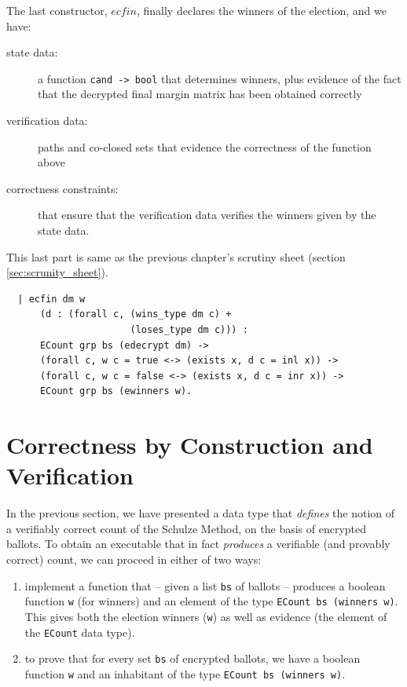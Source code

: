  \noindent
The last constructor, $ecfin$, finally declares the winners of the election,
and we have:
\begin{description}
  \item[state data:] a function \texttt{cand -> bool} that determines
  winners, plus evidence of the fact that the decrypted final margin
  matrix has been obtained correctly
  \item[verification data:] 
   paths and co-closed sets that evidence the correctness of the
   function above
 \item[correctness constraints:] that ensure that the verification
 data verifies the winners given by the state data.
\end{description}
This last part is same as the previous chapter's 
scrutiny sheet (section \ref{sec:scrunity_sheet}).

 \begin{verbatim}
  | ecfin dm w 
      (d : (forall c, (wins_type dm c) + 
                      (loses_type dm c))) :
      ECount grp bs (edecrypt dm) ->
      (forall c, w c = true <-> (exists x, d c = inl x)) ->
      (forall c, w c = false <-> (exists x, d c = inr x)) ->
      ECount grp bs (ewinners w).  

\end{verbatim}













\section{Correctness by Construction and Verification}
\label{sec:correct}

In the previous section, we have presented a data type that
\emph{defines} the notion of a verifiably correct count of the
Schulze Method, on the basis of encrypted ballots. To obtain an
executable that in fact \emph{produces} a verifiable (and provably
correct) count, we can proceed in either of two ways:
\begin{enumerate}
  \item implement a function that -- given a list \texttt{bs} of
  ballots -- produces a boolean function \texttt{w} (for winners) and an
  element of the type \texttt{ECount bs (winners w)}. This gives
  both the election winners (\texttt{w}) as well as evidence (the
  element of the \texttt{ECount} data type).
  \item to prove that for every set \texttt{bs} of encrypted
  ballots, we have a boolean function \texttt{w} and an inhabitant
  of the type \texttt{ECount bs (winners w)}.
\end{enumerate}

